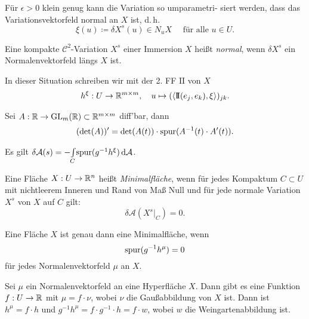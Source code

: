 \documentclass{cheat-sheet}
\newcommand{\II}{\mathrm{I\!I}}
\newcommand{\A}{\mathcal{A}}
\begin{document}
\begin{lem}
  Für $\epsilon > 0$ klein genug kann die Variation so umparametri- siert werden, dass das Variationsvektorfeld normal an $X$ ist, d.\,h.
  \[ \xi(u) \coloneqq \delta X^s(u) \in N_u X \quad \text{ für alle } u \in U. \]
\end{lem}

\begin{defn}
  Eine kompakte $\mathcal{C}^2$-Variation $X^s$ einer Immersion $X$ heißt \emph{normal}, wenn $\delta X^s$ ein Normalenvektorfeld längs $X$ ist.
\end{defn}

\begin{defn}
  In dieser Situation schreiben wir mit der 2. FF $\II$ von $X$
  \[ h^\xi : U \to \R^{m \times m}, \quad u \mapsto (\langle \II(e_j, e_k), \xi \rangle)_{jk}. \]
\end{defn}

\begin{lem}
  Sei $A : \mathbb{R} \to \mathrm{GL}_m(\mathbb{R}) \subset \mathbb{R}^{m \times m}$ diff'bar, dann
  \[ (\det(A))' = \det(A(t)) \cdot \mathrm{spur}(A^{-1}(t) \cdot A'(t)). \]
\end{lem}

\begin{satz}[1. Variation]
  Es gilt $\delta \A(s) = - \Int{C}{}{\spur(g^{-1} h^\xi)}{\A}$.
\end{satz}

\begin{defn}
  Eine Fläche $X : U \to \mathbb{R}^n$ heißt \emph{Minimalfläche}, wenn für jedes Kompaktum $C \subset U$ mit nichtleerem Inneren und Rand von Maß Null und für jede normale Variation $X^s$ von $X$ auf $C$ gilt:
  \[ \delta \A(X^s|_C) = 0. \]
\end{defn}

\begin{satz}
  Eine Fläche $X$ ist genau dann eine Minimalfläche, wenn
  \[ \mathrm{spur}(g^{-1} h^{\mu}) = 0 \]
  für jedes Normalenvektorfeld $\mu$ an $X$.
\end{satz}



\begin{bem}
  Sei $\mu$ ein Normalenvektorfeld an eine Hyperfläche $X$. Dann gibt es eine Funktion $f : U \to \mathbb{R}$ mit $\mu = f \cdot \nu$, wobei $\nu$ die Gaußabbildung von $X$ ist. Dann ist $h^\mu = f \cdot h$ und $g^{-1} h^{\mu} = f \cdot g^{-1} \cdot h = f \cdot w$, wobei $w$ die Weingartenabbildung ist.
\end{bem}
\end{document}
